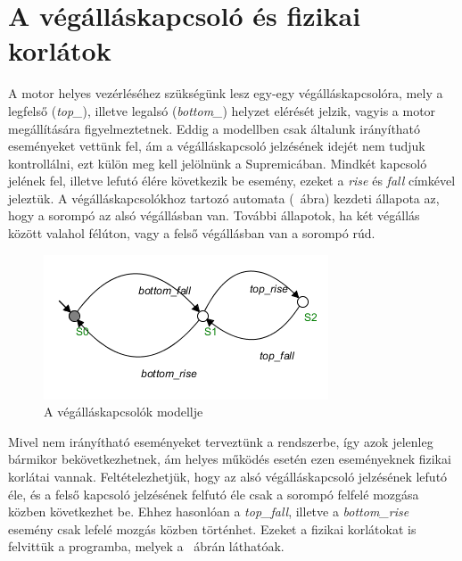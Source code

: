 \section{A végálláskapcsoló és fizikai korlátok}
A motor helyes vezérléséhez szükségünk lesz egy-egy végálláskapcsolóra, mely a legfelső (\textit{top\_}), illetve legalsó (\textit{bottom\_}) helyzet elérését jelzik, vagyis a motor megállítására figyelmeztetnek. Eddig a modellben csak általunk irányítható eseményeket vettünk fel, ám a végálláskapcsoló jelzésének idejét nem tudjuk kontrollálni, ezt külön meg kell jelölnünk a Supremicában. Mindkét kapcsoló jelének fel, illetve lefutó élére következik be esemény, ezeket a \textit{rise} és \textit{fall} címkével jeleztük. A végálláskapcsolókhoz tartozó automata (~ábra) kezdeti állapota az, hogy a sorompó az alsó végállásban van. További állapotok, ha két végállás között valahol félúton, vagy a felső végállásban van a sorompó rúd.
\begin{figure}
	\centering
	\includegraphics[keepaspectratio]{figures/2m03/b_limit.png}
	\caption{A végálláskapcsolók modellje}
	\label{fig:Limit}
\end{figure}
Mivel nem irányítható eseményeket terveztünk a rendszerbe, így azok jelenleg bármikor bekövetkezhetnek, ám helyes működés esetén ezen eseményeknek fizikai korlátai vannak. Feltételezhetjük, hogy az alsó végálláskapcsoló jelzésének lefutó éle, és a felső kapcsoló jelzésének felfutó éle csak a sorompó felfelé mozgása közben következhet be. Ehhez hasonlóan a \textit{top\_fall}, illetve a \textit{bottom\_rise} esemény csak lefelé mozgás közben történhet. Ezeket a fizikai korlátokat is felvittük a programba, melyek a ~ábrán láthatóak.

